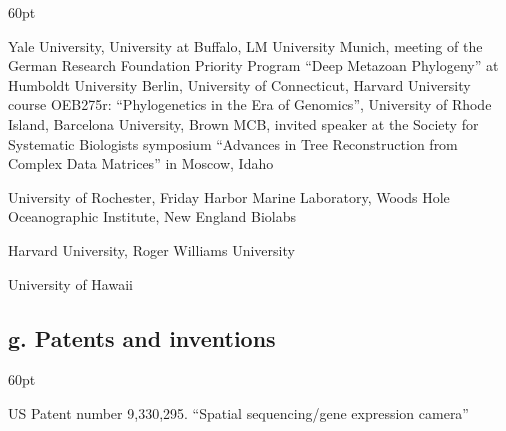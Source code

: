 \begin{entry}{60pt}
\item [\rm 2009] Yale University, University at Buffalo, LM University Munich, meeting of the German Research Foundation Priority Program ``Deep Metazoan Phylogeny'' at Humboldt University Berlin, University of Connecticut, Harvard University course OEB275r: ``Phylogenetics in the Era of Genomics'', University of Rhode Island, Barcelona University, Brown MCB, invited speaker at the Society for Systematic Biologists symposium ``Advances in Tree Reconstruction from Complex Data Matrices'' in Moscow, Idaho

\item [\rm 2008] University of Rochester, Friday Harbor Marine Laboratory, Woods Hole Oceanographic Institute, New England Biolabs

\item [\rm 2007] Harvard University, Roger Williams University

\item [\rm 2005] University of Hawaii

\end{entry}

\subsection*{g. Patents and inventions}

\begin{entry}{60pt}

\item [\rm 2016] US Patent number 9,330,295. ``Spatial sequencing/gene expression camera''

\end{entry}

